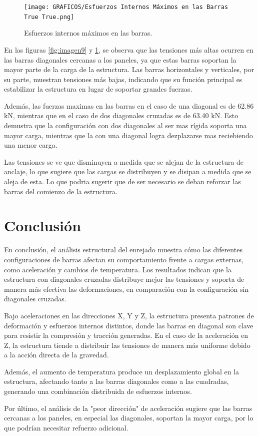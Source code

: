 \begin{figure}[H]
    \centering
    \texttt{[image: GRAFICOS/Esfuerzos Internos Máximos en las Barras True True.png]}
    \caption{Esfuerzos internos máximos en las barras.}
    \label{fig:imagen99}
\end{figure}

En las figuras \ref{fig:imagen9} y \ref{fig:imagen99}, se observa que las tensiones más altas ocurren en las barras diagonales cercanas a los paneles, ya que estas barras soportan la mayor parte de la carga de la estructura. Las barras horizontales y verticales, por su parte, muestran tensiones más bajas, indicando que su función principal es estabilizar la estructura en lugar de soportar grandes fuerzas.

Además, las fuerzas maximas en las barras en el caso de una diagonal es de 62.86 kN, mientras que en el caso de dos diagonales cruzadas es de 63.40 kN. Esto demustra que la configuración con dos diagonales al ser mas rígida soporta una mayor carga, mientras que la con una diagonal logra dezplazarse mas reciebiendo una menor carga.

Las tensiones se ve que disminuyen a medida que se alejan de la estructura de anclaje, lo que sugiere que las cargas se distribuyen y se disipan a medida que se aleja de esta. Lo que podria sugerir que de ser necesario se deban reforzar las barras del comienzo de la estructura.

\newpage
\section{Conclusión}

En conclusión, el análisis estructural del enrejado muestra cómo las diferentes configuraciones de barras afectan su comportamiento frente a cargas externas, como aceleración y cambios de temperatura. Los resultados indican que la estructura con diagonales cruzadas distribuye mejor las tensiones y soporta de manera más efectiva las deformaciones, en comparación con la configuración sin diagonales cruzadas.

Bajo aceleraciones en las direcciones X, Y y Z, la estructura presenta patrones de deformación y esfuerzos internos distintos, donde las barras en diagonal son clave para resistir la compresión y tracción generadas. En el caso de la aceleración en Z, la estructura tiende a distribuir las tensiones de manera más uniforme debido a la acción directa de la gravedad.

Además, el aumento de temperatura produce un desplazamiento global en la estructura, afectando tanto a las barras diagonales como a las cuadradas, generando una combinación distribuida de esfuerzos internos.

Por último, el análisis de la "peor dirección" de aceleración sugiere que las barras cercanas a los paneles, en especial las diagonales, soportan la mayor carga, por lo que podrían necesitar refuerzo adicional.